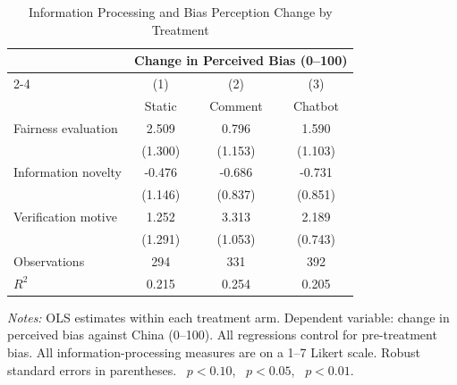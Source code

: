 \begin{table}[htbp]
\centering
\caption{Information Processing and Bias Perception Change by Treatment}
\label{tab:withinbias}
\begin{tabular}{l*{3}{c}}
\toprule
 & \multicolumn{3}{c}{Change in Perceived Bias (0--100)} \\
\cmidrule(lr){2-4}
                    &\multicolumn{1}{c}{(1)}&\multicolumn{1}{c}{(2)}&\multicolumn{1}{c}{(3)}\\
                    &\multicolumn{1}{c}{Static}&\multicolumn{1}{c}{Comment}&\multicolumn{1}{c}{Chatbot}\\
\midrule
Fairness evaluation &       2.509\sym{*}  &       0.796         &       1.590         \\
                    &     (1.300)         &     (1.153)         &     (1.103)         \\
\addlinespace
Information novelty &      -0.476         &      -0.686         &      -0.731         \\
                    &     (1.146)         &     (0.837)         &     (0.851)         \\
\addlinespace
Verification motive &       1.252         &       3.313\sym{***}&       2.189\sym{***}\\
                    &     (1.291)         &     (1.053)         &     (0.743)         \\
\midrule
Observations        &         294         &         331         &         392         \\
$R^2$               &       0.215         &       0.254         &       0.205         \\
\bottomrule
\end{tabular}
\par\vspace{4pt}
\begin{minipage}{\textwidth}
\footnotesize \textit{Notes:} OLS estimates within each treatment arm. Dependent variable: change in perceived bias against China (0--100). All regressions control for pre-treatment bias. All information-processing measures are on a 1--7 Likert scale. Robust standard errors in parentheses. \sym{*}~$p<0.10$, \sym{**}~$p<0.05$, \sym{***}~$p<0.01$.
\end{minipage}
\end{table}
